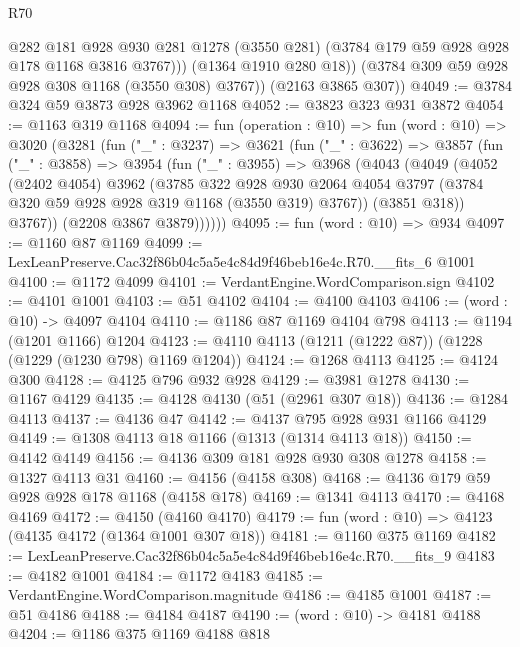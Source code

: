 \begin{lexlean}{R70}
\begin{coremodule}
              @282
              @181
              @928
              @930
              @281
              @1278
              (@3550 @281)
              (@3784 @179 @59 @928 @928 @178 @1168 @3816 @3767)))
          (@1364 @1910 @280 @18))
        (@3784 @309 @59 @928 @928 @308 @1168 (@3550 @308) @3767))
      (@2163 @3865 @307))
@4049 := @3784 @324 @59 @3873 @928 @3962 @1168
@4052 := @3823 @323 @931 @3872
@4054 := @1163 @319 @1168
@4094 := fun (operation : @10) =>
  fun (word : @10) =>
  @3020
    (@3281
      (fun ("_" : @3237) =>
      @3621
        (fun ("_" : @3622) =>
        @3857
          (fun ("_" : @3858) =>
          @3954
            (fun ("_" : @3955) =>
            @3968
              (@4043
                (@4049
                  (@4052
                    (@2402 @4054)
                    @3962
                    (@3785
                      @322
                      @928
                      @930
                      @2064
                      @4054
                      @3797
                      (@3784 @320 @59 @928 @928 @319 @1168 (@3550 @319) @3767))
                    (@3851 @318))
                  @3767))
              (@2208 @3867 @3879))))))
@4095 := fun (word : @10) => @934
@4097 := @1160 @87 @1169
@4099 := LexLeanPreserve.Cac32f86b04c5a5e4c84d9f46beb16e4c.R70.__fits_6 @1001
@4100 := @1172 @4099
@4101 := VerdantEngine.WordComparison.sign
@4102 := @4101 @1001
@4103 := @51 @4102
@4104 := @4100 @4103
@4106 := (word : @10) -> @4097 @4104
@4110 := @1186 @87 @1169 @4104 @798
@4113 := @1194 (@1201 @1166) @1204
@4123 := @4110 @4113 (@1211 (@1222 @87)) (@1228 (@1229 (@1230 @798) @1169 @1204))
@4124 := @1268 @4113
@4125 := @4124 @300
@4128 := @4125 @796 @932 @928
@4129 := @3981 @1278
@4130 := @1167 @4129
@4135 := @4128 @4130 (@51 (@2961 @307 @18))
@4136 := @1284 @4113
@4137 := @4136 @47
@4142 := @4137 @795 @928 @931 @1166 @4129
@4149 := @1308 @4113 @18 @1166 (@1313 (@1314 @4113 @18))
@4150 := @4142 @4149
@4156 := @4136 @309 @181 @928 @930 @308 @1278
@4158 := @1327 @4113 @31
@4160 := @4156 (@4158 @308)
@4168 := @4136 @179 @59 @928 @928 @178 @1168 (@4158 @178)
@4169 := @1341 @4113
@4170 := @4168 @4169
@4172 := @4150 (@4160 @4170)
@4179 := fun (word : @10) => @4123 (@4135 @4172 (@1364 @1001 @307 @18))
@4181 := @1160 @375 @1169
@4182 := LexLeanPreserve.Cac32f86b04c5a5e4c84d9f46beb16e4c.R70.__fits_9
@4183 := @4182 @1001
@4184 := @1172 @4183
@4185 := VerdantEngine.WordComparison.magnitude
@4186 := @4185 @1001
@4187 := @51 @4186
@4188 := @4184 @4187
@4190 := (word : @10) -> @4181 @4188
@4204 := @1186
    @375
    @1169
    @4188
    @818

\end{coremodule}
\end{lexlean}
